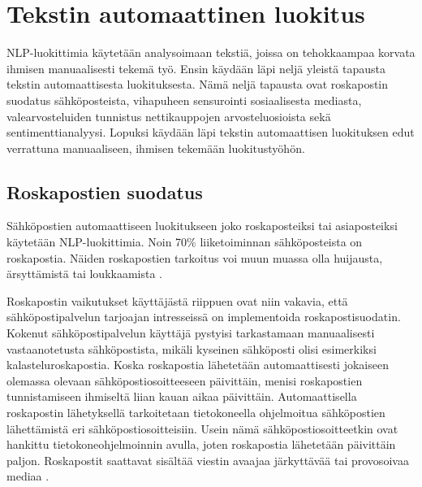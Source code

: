 \chapter{Tekstin automaattinen luokitus\label{methods}}

NLP-luokittimia käytetään analysoimaan tekstiä, joissa on tehokkaampaa korvata ihmisen manuaalisesti tekemä työ. Ensin käydään läpi neljä yleistä tapausta tekstin automaattisesta luokituksesta. Nämä neljä tapausta ovat roskapostin suodatus sähköposteista, vihapuheen sensurointi sosiaalisesta mediasta, valearvosteluiden tunnistus nettikauppojen arvosteluosioista sekä sentimenttianalyysi. Lopuksi käydään läpi tekstin automaattisen luokituksen edut verrattuna manuaaliseen, ihmisen tekemään luokitustyöhön.

\section{Roskapostien suodatus}

Sähköpostien automaattiseen luokitukseen joko roskaposteiksi tai asiaposteiksi käytetään NLP-luokittimia. Noin 70\% liiketoiminnan sähköposteista on roskapostia. Näiden roskapostien tarkoitus voi muun muassa olla huijausta, ärsyttämistä tai loukkaamista \citep{spam}.

Roskapostin vaikutukset käyttäjästä riippuen ovat niin vakavia, että sähköpostipalvelun tarjoajan intresseissä on implementoida roskapostisuodatin. Kokenut sähköpostipalvelun käyttäjä pystyisi tarkastamaan manuaalisesti vastaanotetusta sähköpostista, mikäli kyseinen sähköposti olisi esimerkiksi kalasteluroskapostia. Koska roskapostia lähetetään automaattisesti jokaiseen olemassa olevaan sähköpostiosoitteeseen päivittäin, menisi roskapostien tunnistamiseen ihmiseltä liian kauan aikaa päivittäin. Automaattisella roskapostin lähetyksellä tarkoitetaan tietokoneella ohjelmoitua sähköpostien lähettämistä eri sähköpostiosoitteisiin. Usein nämä sähköpostiosoitteetkin ovat hankittu tietokoneohjelmoinnin avulla, joten roskapostia lähetetään päivittäin paljon. Roskapostit saattavat sisältää viestin avaajaa järkyttävää tai provosoivaa mediaa \citep{spam}.

